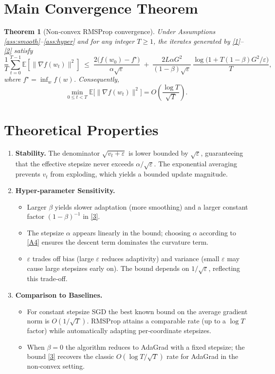 \documentclass{article}
\newtheorem{theorem}{Theorem}
\newcommand{\E}{\mathbb{E}}
\begin{document}
\section*{Main Convergence Theorem}
\begin{theorem}[Non‑convex RMSProp convergence]\label{thm:main}
Under Assumptions \ref{ass:smooth}–\ref{ass:hyper} and for any integer $T\ge1$,
the iterates generated by \eqref{1}–\eqref{2} satisfy
\[
\frac{1}{T}\sum_{t=0}^{T-1}\E\!\left[\big\|\nabla f(w_t)\big\|^2\right]
\;\le\;
\frac{2\big(f(w_0)-f^\star\big)}{\alpha\sqrt{\varepsilon}}
\;+\;
\frac{2L\alpha G^2}{(1-\beta)\sqrt{\varepsilon}}\,\frac{\log\!\big(1+T(1-\beta)G^2/\varepsilon\big)}{T},
\tag{3}
\]
where $f^\star=\inf_{w}f(w)$. Consequently,
\[
\min_{0\le t<T}\E\!\big[\|\nabla f(w_t)\|^2\big]=O\!\left(\frac{\log T}{\sqrt{T}}\right).
\]
\end{theorem}

\section*{Theoretical Properties}
\begin{enumerate}[label=\arabic*.]
\item \textbf{Stability.} The denominator $\sqrt{v_t+\varepsilon}$ is lower bounded by
$\sqrt{\varepsilon}$, guaranteeing that the effective stepsize never exceeds
$\alpha/\sqrt{\varepsilon}$. The exponential averaging prevents $v_t$ from
exploding, which yields a bounded update magnitude.

\item \textbf{Hyper‑parameter Sensitivity.}
\begin{itemize}
\item Larger $\beta$ yields slower adaptation (more smoothing) and a larger
constant factor $(1-\beta)^{-1}$ in \eqref{3}.
\item The stepsize $\alpha$ appears linearly in the bound; choosing $\alpha$
according to \eqref{A4} ensures the descent term dominates the curvature term.
\item $\varepsilon$ trades off bias (large $\varepsilon$ reduces adaptivity) and
variance (small $\varepsilon$ may cause large stepsizes early on). The bound
depends on $1/\sqrt{\varepsilon}$, reflecting this trade‑off.
\end{itemize}

\item \textbf{Comparison to Baselines.}
\begin{itemize}
\item For constant stepsize SGD the best known bound on the average gradient norm
is $O(1/\sqrt{T})$. RMSProp attains a comparable rate (up to a $\log T$ factor)
while automatically adapting per‑coordinate stepsizes.
\item When $\beta=0$ the algorithm reduces to AdaGrad with a fixed stepsize;
the bound \eqref{3} recovers the classic $O(\log T/\sqrt{T})$ rate for AdaGrad
in the non‑convex setting.
\end{itemize}
\end{enumerate}
\end{document}
